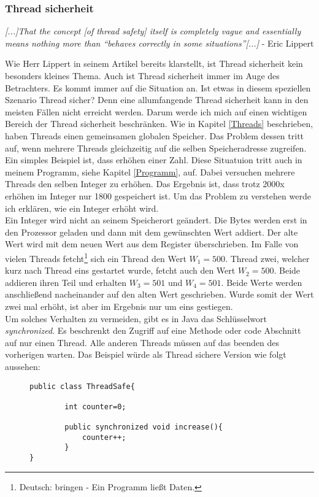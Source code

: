 \subsubsection{Thread sicherheit}
\begin{center}
    \textit{
        [...]That the concept [of thread safety] itself is completely vague and essentially means nothing more than ``behaves correctly in some situations''[...]
    } - Eric Lippert \cite{Threads:Lippert}
\end{center}

Wie Herr Lippert in seinem Artikel bereits klarstellt, ist Thread sicherheit kein besonders kleines Thema. Auch ist Thread sicherheit immer im Auge des Betrachters. Es kommt immer auf die Situation an. Ist etwas in diesem speziellen Szenario Thread sicher? Denn eine allumfangende Thread sicherheit kann in den meisten Fällen nicht erreicht werden. Darum werde ich mich auf einen wichtigen Bereich der Thread sicherheit beschränken.
\medskip
\newline
Wie in Kapitel \ref{Threads} beschrieben, haben Threads einen gemeinsamen globalen Speicher. Das Problem dessen tritt auf, wenn mehrere Threads gleichzeitig auf die selben Speicheradresse zugreifen. Ein simples Beispiel ist, dass erhöhen einer Zahl. Diese Situatuion tritt auch in meinem Programm, siehe Kapitel \ref{Programm}, auf. Dabei versuchen mehrere Threads den selben Integer zu erhöhen. Das Ergebnis ist, dass trotz 2000x erhöhen im Integer nur 1800 gespeichert ist. Um das Problem zu verstehen werde ich erklären, wie ein Integer erhöht wird.\\
Ein Integer wird nicht an seinem Speicherort geändert. Die Bytes werden erst in den Prozessor geladen und dann mit dem gewünschten Wert addiert. Der alte Wert wird mit dem neuen Wert aus dem Register überschrieben. Im Falle von vielen Threads fetcht\footnote{Deutsch: bringen - Ein Programm ließt Daten.} sich ein Thread den Wert $W_1 = 500$. Thread zwei, welcher kurz nach Thread eins gestartet wurde, fetcht auch den Wert $W_2 = 500$. Beide addieren ihren Teil und erhalten $W_3 = 501$ und $W_4 = 501$. Beide Werte werden anschließend nacheinander auf den alten Wert geschrieben. Wurde somit der Wert zwei mal erhöht, ist aber im Ergebnis nur um eins gestiegen.\cite{ThreadInterference:Oracle}\\
Um solches Verhalten zu vermeiden, gibt es in Java das Schlüsselwort \textit{synchronized}. Es beschrenkt den Zugriff auf eine Methode oder code Abschnitt auf nur einen Thread. Alle anderen Threads müssen auf das beenden des vorherigen warten. Das Beispiel würde als Thread sichere Version wie folgt aussehen: \cite{SynchronizedMethods:Oracle}
\begin{figure}[h]
    \begin{lstlisting}
public class ThreadSafe{

        int counter=0;

        public synchronized void increase(){
            counter++;
        }
}
    \end{lstlisting}
\end{figure}